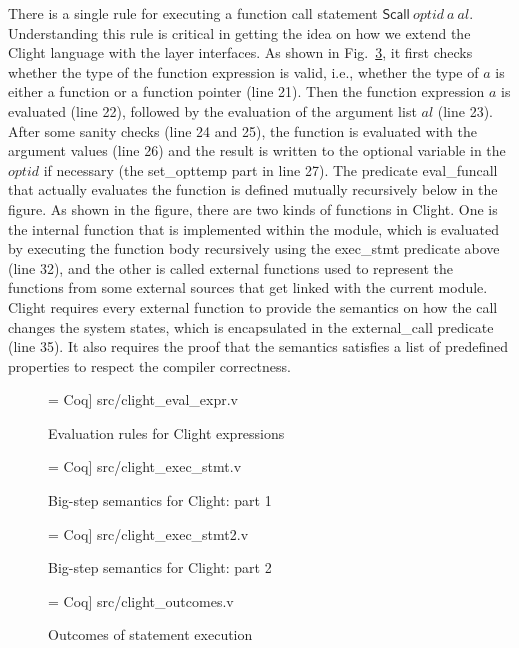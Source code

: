 There is a single rule for executing a function call statement
$\textsf{Scall}~optid~a~al$.
Understanding this rule is critical in getting the idea on how we extend the
Clight language with the layer interfaces. As shown in
Fig.~\ref{fig:clight_exec_stmt2}, it first checks whether the type
of the function expression is valid, i.e., whether the type of $a$ is
either a function or a function pointer (line 21).
Then the function expression $a$ is evaluated (line 22), followed
by the evaluation of the argument list $al$ (line 23). After some sanity checks
(line 24 and 25), the function is evaluated with the argument values
(line 26) and the result is written to the optional variable in the $optid$
if necessary (the \textsf{set\_opttemp} part in line 27).
The predicate \textsf{eval\_funcall} that actually evaluates the function
is defined mutually recursively below in the figure. 
As shown in the figure, there are two kinds of functions in Clight.
One is the internal function that is implemented within the module,
which is evaluated by executing the function body recursively using
the \textsf{exec\_stmt} predicate above (line 32), and the other
is called external functions used to represent the functions from
some external sources that get linked with the current module.
Clight requires every external function to provide the semantics on
how the call changes the system states, which is encapsulated in
the \textsf{external\_call} predicate (line 35). It also requires
the proof that the semantics satisfies a list of predefined properties
to respect the compiler correctness.

\begin{figure}
 = Coq] {src/clight_eval_expr.v}
\caption{Evaluation rules for Clight expressions}
\label{fig:clight_eval_expr}
\end{figure}

\begin{figure}
 = Coq] {src/clight_exec_stmt.v}
\caption{Big-step semantics for Clight: part 1}
\label{fig:clight_exec_stmt}
\end{figure}

\begin{figure}
 = Coq] {src/clight_exec_stmt2.v}
\caption{Big-step semantics for Clight: part 2}
\label{fig:clight_exec_stmt2}
\end{figure}

\begin{figure}
 = Coq] {src/clight_outcomes.v}
\caption{Outcomes of statement execution}
\label{fig:clight_outcomes}
\end{figure}


